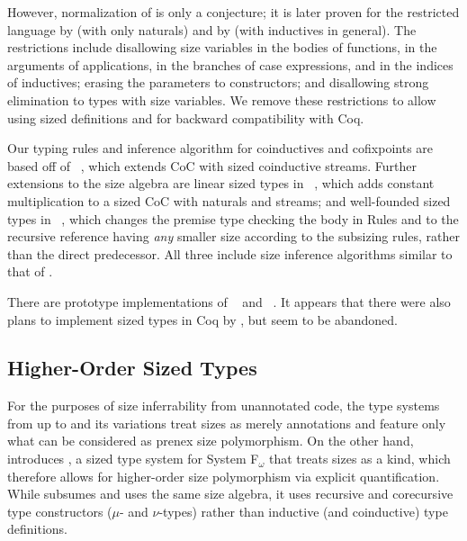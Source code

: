 However, normalization of \CIChat is only a conjecture; it is later proven for the restricted language \CIChatminus by \citet{cic-hat-minus-nat} (with only naturals) and by \citet{cic-hat-minus} (with inductives in general).
The restrictions include disallowing size variables in the bodies of functions, in the arguments of applications, in the branches of case expressions, and in the indices of inductives; erasing the parameters to constructors; and disallowing strong elimination to types with size variables.
We remove these restrictions to allow using sized definitions and for backward compatibility with Coq.

Our typing rules and inference algorithm for coinductives and cofixpoints are based off of \CChatomega~\citep{cc-hat-omega},
which extends CoC with sized coinductive streams.
Further extensions to the size algebra are linear sized types in \CIChatl~\citep{cic-hat-l},
which adds constant multiplication to a sized CoC with naturals and streams;
and well-founded sized types in \CIChatsub~\citep{wellfounded},
which changes the premise type checking the \cofixpoint body in Rules  and 
to the recursive reference having \emph{any} smaller size according to the subsizing rules,
rather than the direct predecessor.
All three include size inference algorithms similar to that of \CIChat.

There are prototype implementations of \CIChatminus~\citep{cicminus} and \CIChatsub~\citep{cic-wf}.
It appears that there were also plans to implement sized types in Coq by \citet{coq-hat}, but seem to be abandoned.

\subsection{Higher-Order Sized Types}

For the purposes of size inferrability from unannotated code,
the type systems from \lambdahat up to \CIChat and its variations treat sizes as merely annotations
and feature only what can be considered as prenex size polymorphism.
On the other hand, \citet{abel-diss} introduces \Fomegahat, a sized type system for System F$_\omega$ that treats sizes as a kind,
which therefore allows for higher-order size polymorphism via explicit quantification.
While \Fomegahat subsumes \Fhat and uses the same size algebra,
it uses recursive and corecursive type constructors ($\mu$- and $\nu$-types) rather than inductive (and coinductive) type definitions.

